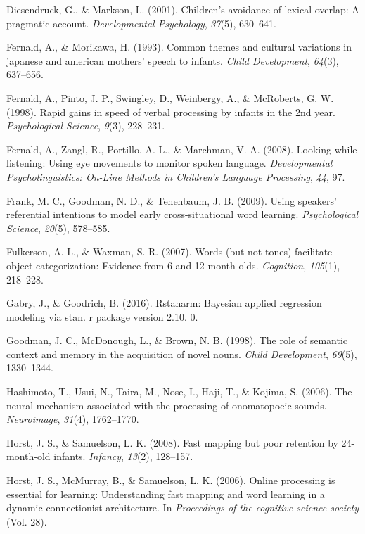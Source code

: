 \documentclass[english,floatsintext,man]{apa6}
\theoremstyle{definition}
\theoremstyle{definition}
\theoremstyle{definition}
\theoremstyle{remark}
\begin{document}
\hypertarget{ref-diesendruck2001children}{}
Diesendruck, G., \& Markson, L. (2001). Children's avoidance of lexical
overlap: A pragmatic account. \emph{Developmental Psychology},
\emph{37}(5), 630--641.

\hypertarget{ref-fernald1993common}{}
Fernald, A., \& Morikawa, H. (1993). Common themes and cultural
variations in japanese and american mothers' speech to infants.
\emph{Child Development}, \emph{64}(3), 637--656.

\hypertarget{ref-fernald1998rapid}{}
Fernald, A., Pinto, J. P., Swingley, D., Weinbergy, A., \& McRoberts, G.
W. (1998). Rapid gains in speed of verbal processing by infants in the
2nd year. \emph{Psychological Science}, \emph{9}(3), 228--231.

\hypertarget{ref-fernald2008looking}{}
Fernald, A., Zangl, R., Portillo, A. L., \& Marchman, V. A. (2008).
Looking while listening: Using eye movements to monitor spoken language.
\emph{Developmental Psycholinguistics: On-Line Methods in Children's
Language Processing}, \emph{44}, 97.

\hypertarget{ref-frank2009using}{}
Frank, M. C., Goodman, N. D., \& Tenenbaum, J. B. (2009). Using
speakers' referential intentions to model early cross-situational word
learning. \emph{Psychological Science}, \emph{20}(5), 578--585.

\hypertarget{ref-fulkerson2007words}{}
Fulkerson, A. L., \& Waxman, S. R. (2007). Words (but not tones)
facilitate object categorization: Evidence from 6-and 12-month-olds.
\emph{Cognition}, \emph{105}(1), 218--228.

\hypertarget{ref-gabry2016rstanarm}{}
Gabry, J., \& Goodrich, B. (2016). Rstanarm: Bayesian applied regression
modeling via stan. r package version 2.10. 0.

\hypertarget{ref-goodman1998role}{}
Goodman, J. C., McDonough, L., \& Brown, N. B. (1998). The role of
semantic context and memory in the acquisition of novel nouns.
\emph{Child Development}, \emph{69}(5), 1330--1344.

\hypertarget{ref-hashimoto2006neural}{}
Hashimoto, T., Usui, N., Taira, M., Nose, I., Haji, T., \& Kojima, S.
(2006). The neural mechanism associated with the processing of
onomatopoeic sounds. \emph{Neuroimage}, \emph{31}(4), 1762--1770.

\hypertarget{ref-horst2008fast}{}
Horst, J. S., \& Samuelson, L. K. (2008). Fast mapping but poor
retention by 24-month-old infants. \emph{Infancy}, \emph{13}(2),
128--157.

\hypertarget{ref-horst2006online}{}
Horst, J. S., McMurray, B., \& Samuelson, L. K. (2006). Online
processing is essential for learning: Understanding fast mapping and
word learning in a dynamic connectionist architecture. In
\emph{Proceedings of the cognitive science society} (Vol. 28).
\end{document}
